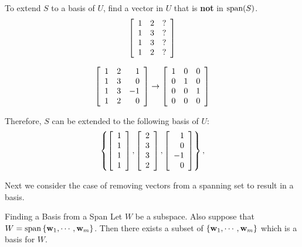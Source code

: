 \begin{solution}
To extend $S$ to a basis of $U$, find a vector in $U$ that is {\bf not} in
$\mbox{span}(S)$.
\[
\left[\begin{array}{rrr}
1 & 2 & ? \\
1 & 3 & ? \\
1 & 3 & ? \\
1 & 2 & ? 
\end{array}\right]
\]

\[
\left[\begin{array}{rrr}
1 & 2 & 1 \\
1 & 3 & 0 \\
1 & 3 & -1 \\
1 & 2 & 0 
\end{array}\right]
\rightarrow
\left[\begin{array}{rrr}
1 & 0 & 0 \\
0 & 1 & 0 \\
0 & 0 & 1 \\
0 & 0 & 0 
\end{array}\right]
\]

Therefore, $S$ can be extended to the following basis of $U$:
\[\left\{ 
\left[\begin{array}{r} 1\\ 1\\ 1\\ 1\end{array}\right],
\left[\begin{array}{r} 2\\ 3\\ 3\\ 2\end{array}\right],
\left[\begin{array}{r} 1\\ 0\\ -1\\ 0\end{array}\right]
\right\},\]
\end{solution}

Next we consider the case of removing vectors from a spanning set to result in a basis. 

\begin{theorem}{Finding a Basis from a Span}{}
Let $W$ be a subspace. Also suppose that $W=\mbox{span}\left\{ {\bf w}
_{1},\cdots ,{\bf w}_{m}\right\} $. Then there exists a subset of $\left\{ 
{\bf w}_{1},\cdots ,{\bf w}_{m}\right\} $ which is a basis for $W$.
\end{theorem}

